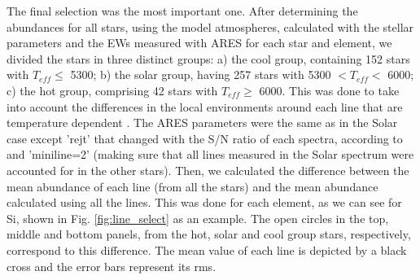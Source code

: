 \documentclass[oldversion]{aa}
\begin{document}



The final selection was the most important one. After determining the abundances for all stars, using the \citet{Kurucz-1993} model atmospheres, calculated with the stellar parameters and the EWs measured with ARES for each star and element, we divided the stars in three distinct groups: a) the cool group, containing 152 stars with $T_{eff} \leq$ 5300; b) the solar group, having 257 stars with 5300 $<T_{eff}<$ 6000; c) the hot group, comprising 42 stars with $T_{eff} \geq$ 6000. This was done to take into account the differences in the local environments around each line that are temperature dependent \citep{Sousa-2008}. The ARES parameters were the same as in the Solar case except 'rejt' that changed with the S/N ratio of each spectra, according to \citet{Sousa-2008} and 'miniline=2' (making sure that all lines measured in the Solar spectrum were accounted for in the other stars). Then, we calculated the difference between the mean abundance of each line (from all the stars) and the mean abundance calculated using all the lines. This was done for each element, as we can see for Si, shown in Fig. \ref{fig:line_select} as an example. The open circles in the top, middle and bottom panels, from the hot, solar and cool group stars, respectively, correspond to this difference. The mean value of each line is depicted by a black cross and the error bars represent its rms.
\end{document}
